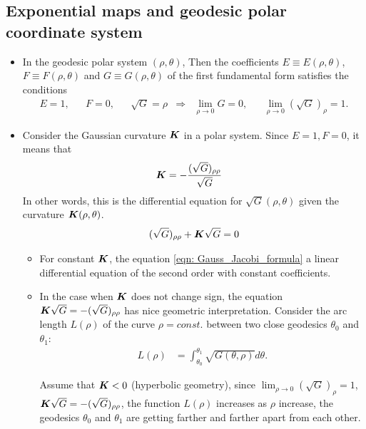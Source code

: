 \documentclass[11pt]{article}
\begin{document}
\subsection{Exponential maps and geodesic polar coordinate system}
\begin{itemize}
\item In the geodesic polar system $(\rho, \theta)$, Then the coefficients $E\equiv E(\rho, \theta)$, $F\equiv F(\rho, \theta)$ and $G\equiv G(\rho, \theta)$ of the first fundamental form satisfies the conditions
\begin{align}
E = 1, && F=0, && \sqrt{G}=\rho &\Rightarrow& \lim_{\rho \rightarrow 0}G = 0, && \lim_{\rho\rightarrow 0}(\sqrt{G})_{\rho} = 1. \label{eqn: Gauss_lemma}
\end{align}

\item Consider the Gaussian curvature $\boldsymbol{K}$ in a polar system. Since $E=1,F=0$, it means that 
\begin{align}
\boldsymbol{K} &= -\frac{(\sqrt{G})_{\rho\rho}}{\sqrt{G}} \label{eqn: Gauss_Jacobi_formula}
\end{align}
In other words, this is the differential equation for $\sqrt{G}(\rho, \theta)$ given the curvature $\boldsymbol{K}(\rho, \theta)$.  
\begin{align}
(\sqrt{G})_{\rho\rho} + \boldsymbol{K}\sqrt{G} = 0 \label{eqn: Gauss_Jacobi_formula2}
\end{align}
\begin{itemize}
\item For constant $\boldsymbol{K}$, the equation \eqref{eqn: Gauss_Jacobi_formula} a linear differential equation of the second order with constant coefficients. 

\item In the case when $\boldsymbol{K}$ does not change sign, the equation $\boldsymbol{K}\sqrt{G} = -(\sqrt{G})_{\rho\rho}$ has nice geometric interpretation. Consider the arc length $L(\rho)$ of the curve $\rho = const.$ between two close geodesics $\theta_{0}$ and $\theta_{1}$: 
\begin{align*}
L(\rho) &= \int_{\theta_{0}}^{\theta_{1}}\sqrt{G(\theta, \rho)}d\theta.
\end{align*}

Assume that $\boldsymbol{K}<0$ (hyperbolic geometry), since $\lim_{\rho\rightarrow 0}(\sqrt{G})_{\rho} = 1$, $\boldsymbol{K}\sqrt{G} = -(\sqrt{G})_{\rho\rho}$, the function $L(\rho)$ increases as $\rho$ increase, the geodesics $\theta_{0}$ and $\theta_{1}$ are getting farther and farther apart from each other. 


\end{itemize}
\end{itemize}
\end{document}
